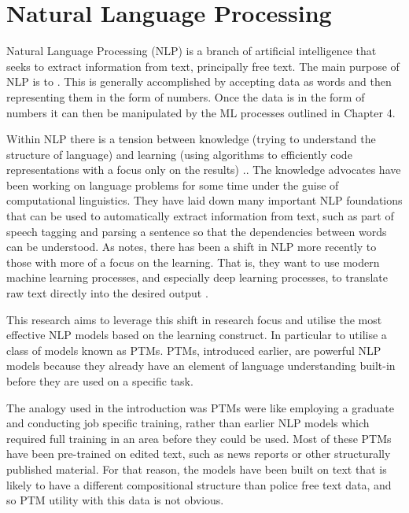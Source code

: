 \chapter{Natural Language Processing}

Natural Language Processing (NLP) is a branch of artificial intelligence that seeks to extract information from text, principally free text. The main purpose of NLP is to  \parencite{eisenstein2018natural}. This is generally accomplished by accepting data as words and then representing them in the form of numbers. Once the data is in the form of numbers it can then be manipulated by the ML processes outlined in Chapter 4.


Within NLP there is a tension between knowledge (trying to understand the structure of language) and learning (using algorithms to efficiently code representations with a focus only on the results) \parencite{eisenstein2018natural}.. The knowledge advocates have been working on language problems for some time under the guise of computational linguistics. They have laid down many important NLP foundations that can be used to automatically extract information from text, such as part of speech tagging and parsing a sentence so that the dependencies between words can be understood. As \textcite{manning2015computational} notes, there has been a shift in NLP more recently to those with more of a focus on the learning. That is, they want to use modern machine learning processes, and especially deep learning processes, to translate raw text directly into the desired output \parencite{eisenstein2018natural}.

This research aims to leverage this shift in research focus and utilise the most effective NLP models based on the learning construct. In particular to utilise a class of models known as PTMs. PTMs, introduced earlier, are powerful NLP models  because they already have an element of language understanding built-in before they are used on a specific task. 

The analogy used in the introduction was PTMs were like employing a graduate and conducting job specific  training, rather than earlier NLP models which required full training in an area before they could be used. Most of these PTMs have been pre-trained on edited text, such as news reports or other structurally published material. For that reason, the models have been built on text that is likely to have a different compositional structure than police free text data, and so PTM utility with this data is not obvious.

